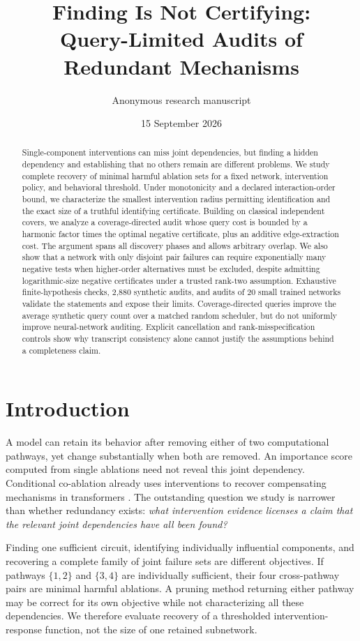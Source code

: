 \documentclass[10pt]{article}
\title{\vspace{-1.2em}Finding Is Not Certifying:\\Query-Limited Audits of Redundant Mechanisms}
\author{Anonymous research manuscript}
\date{15 September 2026}
\theoremstyle{definition}\newtheorem{definition}[theorem]{Definition}
\begin{document}
\maketitle
\begin{abstract}
Single-component interventions can miss joint dependencies, but finding a hidden
dependency and establishing that no others remain are different problems. We study
complete recovery of minimal harmful ablation sets for a fixed network, intervention
policy, and behavioral threshold. Under monotonicity and a declared interaction-order
bound, we characterize the smallest intervention radius permitting identification and
the exact size of a truthful identifying certificate. Building on classical independent
covers, we analyze a coverage-directed audit whose query cost is bounded by a harmonic
factor times the optimal negative certificate, plus an additive edge-extraction cost.
The argument spans all discovery phases and allows arbitrary overlap. We also show
that a network with only disjoint pair failures can require exponentially many
negative tests when higher-order alternatives must be excluded, despite admitting
logarithmic-size negative certificates under a trusted rank-two assumption.
Exhaustive finite-hypothesis checks, 2,880 synthetic audits, and audits of 20 small
trained networks validate the statements and expose their limits. Coverage-directed
queries improve the average synthetic query count over a matched random scheduler,
but do not uniformly improve neural-network auditing. Explicit cancellation and
rank-misspecification controls show why transcript consistency alone cannot justify
the assumptions behind a completeness claim.
\end{abstract}

\section{Introduction}
A model can retain its behavior after removing either of two computational pathways,
yet change substantially when both are removed. An importance score computed from
single ablations need not reveal this joint dependency. Conditional co-ablation already
uses interventions to recover compensating mechanisms in transformers
\citep{gong2026}. The outstanding question we study is narrower than whether redundancy
exists: \emph{what intervention evidence licenses a claim that the relevant joint
dependencies have all been found?}

Finding one sufficient circuit, identifying individually influential components, and
recovering a complete family of joint failure sets are different objectives. If
pathways $\{1,2\}$ and $\{3,4\}$ are individually sufficient, their four cross-pathway
pairs are minimal harmful ablations. A pruning method returning either pathway may
be correct for its own objective while not characterizing all these dependencies.
We therefore evaluate recovery of a thresholded intervention-response function,
not the size of one retained subnetwork.
\end{document}
